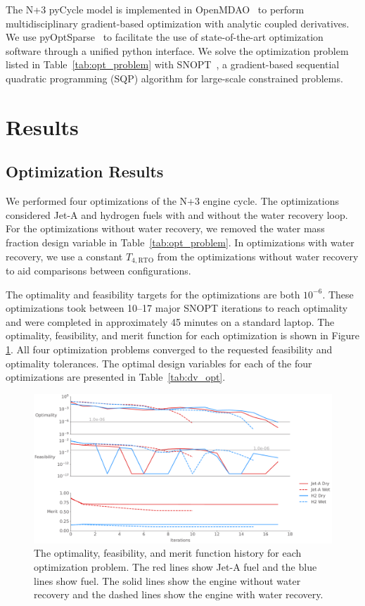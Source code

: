 \documentclass[conf]{new-aiaa}
\begin{document}
The N+3 pyCycle model is implemented in OpenMDAO~\cite{Gray2019a} to perform multidisciplinary gradient-based optimization with analytic coupled derivatives.
We use pyOptSparse~\cite{Wu2020a} to facilitate the use of state-of-the-art optimization software through a unified python interface.
We solve the optimization problem listed in Table~\ref{tab:opt_problem} with SNOPT~\cite{Gill2005a}, a gradient-based sequential quadratic programming (SQP) algorithm for large-scale constrained problems.
\section{Results}
\label{sec:results}

\subsection{Optimization Results}
\label{sub:opt_res}

We performed four optimizations of the N+3 engine cycle.
The optimizations considered Jet-A and hydrogen fuels with and without the water recovery loop.
For the optimizations without water recovery, we removed the water mass fraction design variable in Table~\ref{tab:opt_problem}.
In optimizations with water recovery, we use a constant $T_{4,\text{RTO}}$ from the optimizations without water recovery to aid comparisons between configurations.

The optimality and feasibility targets for the optimizations are both $10^{-6}$.
These optimizations took between 10--17 major SNOPT iterations to reach optimality and were completed in approximately 45 minutes on a standard laptop.
The optimality, feasibility, and merit function for each optimization is shown in Figure \ref{fig:history_summary}.
All four optimization problems converged to the requested feasibility and optimality tolerances.
The optimal design variables for each of the four optimizations are presented in Table~\ref{tab:dv_opt}.

\begin{figure}[hbt!]
  \centering
  \includegraphics[width=1.0\textwidth]{opt_summary.pdf}
  \caption{The optimality, feasibility, and merit function history for each optimization problem.
    The red lines show Jet-A fuel and the blue lines show  fuel.
    The solid lines show the engine without water recovery and the dashed lines show the engine with water recovery.}
  \label{fig:history_summary}
\end{figure}
\end{document}
